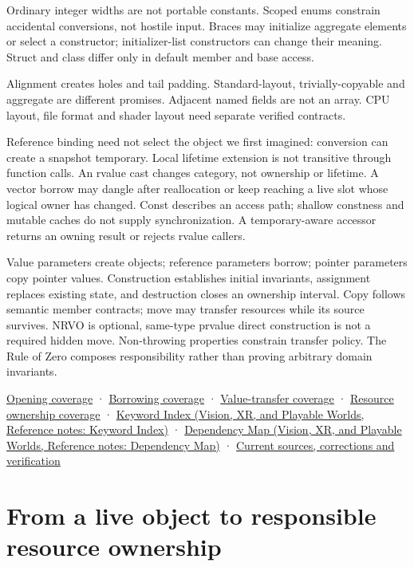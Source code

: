 Ordinary integer widths are not portable constants. Scoped enums constrain accidental conversions, not hostile input. Braces may initialize aggregate elements or select a constructor; initializer-list constructors can change their meaning. Struct and class differ only in default member and base access.

Alignment creates holes and tail padding. Standard-layout, trivially-copyable and aggregate are different promises. Adjacent named fields are not an array. CPU layout, file format and shader layout need separate verified contracts.

Reference binding need not select the object we first imagined: conversion can create a snapshot temporary. Local lifetime extension is not transitive through function calls. An rvalue cast changes category, not ownership or lifetime. A vector borrow may dangle after reallocation or keep reaching a live slot whose logical owner has changed. Const describes an access path; shallow constness and mutable caches do not supply synchronization. A temporary-aware accessor returns an owning result or rejects rvalue callers.

Value parameters create objects; reference parameters borrow; pointer parameters copy pointer values. Construction establishes initial invariants, assignment replaces existing state, and destruction closes an ownership interval. Copy follows semantic member contracts; move may transfer resources while its source survives. NRVO is optional, same-type prvalue direct construction is not a required hidden move. Non-throwing properties constrain transfer policy. The Rule of Zero composes responsibility rather than proving arbitrary domain invariants.

\hyperref[appendix-fd090d982a15-m007---parts-101-112]{Opening coverage} · \hyperref[appendix-fd090d982a15-m008---parts-113-126]{Borrowing coverage} · \hyperref[appendix-fd090d982a15-m009---parts-127-147]{Value-transfer coverage} · \hyperref[appendix-fd090d982a15-m010---parts-148-160]{Resource ownership coverage} · \href{../07-Vision-XR-and-Playable-Worlds/main.pdf\#nameddest=appendix-a6d556a4ef50}{Keyword Index (Vision, XR, and Playable Worlds, Reference notes: Keyword Index)} · \href{../07-Vision-XR-and-Playable-Worlds/main.pdf\#nameddest=appendix-4ad47bdd269a}{Dependency Map (Vision, XR, and Playable Worlds, Reference notes: Dependency Map)} · \hyperref[appendix-a103e7846d21-m010---resource-ownership]{Current sources, corrections and verification}

\section{From a live object to responsible resource ownership}\label{05-engine-i-ch004-from-a-live-object-to-responsible-resource-ownership}

